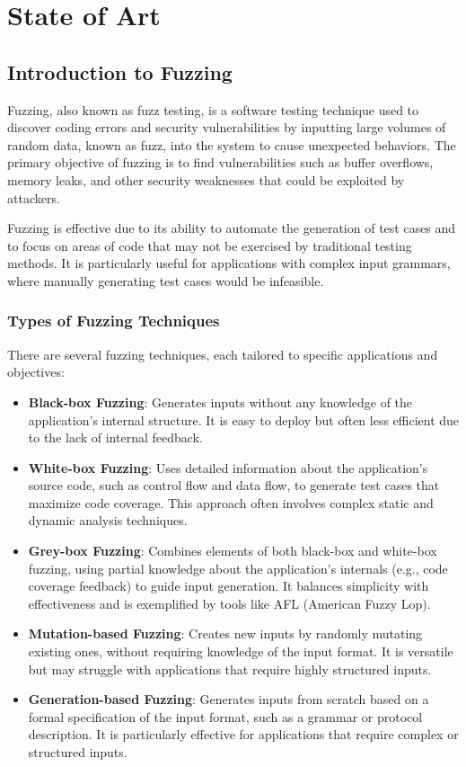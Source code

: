 \chapter{State of Art}

\section{Introduction to Fuzzing}
Fuzzing, also known as fuzz testing, is a software testing technique used to discover coding errors and security vulnerabilities by inputting large volumes of random data, known as fuzz, into the system to cause unexpected behaviors. The primary objective of fuzzing is to find vulnerabilities such as buffer overflows, memory leaks, and other security weaknesses that could be exploited by attackers.

Fuzzing is effective due to its ability to automate the generation of test cases and to focus on areas of code that may not be exercised by traditional testing methods. It is particularly useful for applications with complex input grammars, where manually generating test cases would be infeasible.

\subsection{Types of Fuzzing Techniques}
There are several fuzzing techniques, each tailored to specific applications and objectives:

\begin{itemize}
    \item \textbf{Black-box Fuzzing}: Generates inputs without any knowledge of the application's internal structure. It is easy to deploy but often less efficient due to the lack of internal feedback.
    
    \item \textbf{White-box Fuzzing}: Uses detailed information about the application's source code, such as control flow and data flow, to generate test cases that maximize code coverage. This approach often involves complex static and dynamic analysis techniques.
    
    \item \textbf{Grey-box Fuzzing}: Combines elements of both black-box and white-box fuzzing, using partial knowledge about the application's internals (e.g., code coverage feedback) to guide input generation. It balances simplicity with effectiveness and is exemplified by tools like AFL (American Fuzzy Lop).
    
    \item \textbf{Mutation-based Fuzzing}: Creates new inputs by randomly mutating existing ones, without requiring knowledge of the input format. It is versatile but may struggle with applications that require highly structured inputs.
    
    \item \textbf{Generation-based Fuzzing}: Generates inputs from scratch based on a formal specification of the input format, such as a grammar or protocol description. It is particularly effective for applications that require complex or structured inputs.
\end{itemize}

